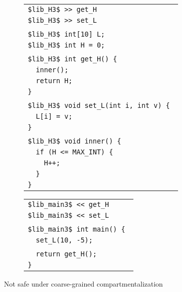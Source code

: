 \documentclass{article}
\begin{document}
\begin{figure}
  \begin{subfigure}{0.49\textwidth}
    \begin{tabular}{l}
      \tt \$lib\_H3\$ >> get\_H \\
      \tt \$lib\_H3\$ >> set\_L \\ \\

      \tt \$lib\_H3\$ int[10] L; \\
      \tt \$lib\_H3\$ int H = 0; \\ \\

      \tt \$lib\_H3\$ int get\_H() \{ \\
      \tt ~ inner(); \\
      \tt ~ return H; \\
      \tt \} \\ \\

      \tt \$lib\_H3\$ void set\_L(int i, int v) \{ \\
      \tt ~ L[i] = v; \\
      \tt \} \\ \\
    
      \tt \$lib\_H3\$ void inner() \{ \\
      \tt ~ if (H <= MAX\_INT) \{ \\
      \tt ~ ~ H++; \\
      \tt ~ \} \\
      \tt \} \\
    \end{tabular}
  \end{subfigure}
  \begin{subfigure}{0.49\textwidth}
    \begin{tabular}{l}
      \tt \$lib\_main3\$ << get\_H \\
      \tt \$lib\_main3\$ << set\_L \\ \\

      \tt \$lib\_main3\$ int main() \{ \\
      \tt ~ set\_L(10, -5); \\ \\
      
      \tt ~ return get\_H(); \\
      \tt \} \\
    \end{tabular}
  \end{subfigure}
  \caption{Not safe under coarse-grained compartmentalization}
  \label{fig:unsafe}
\end{figure}
\end{document}
